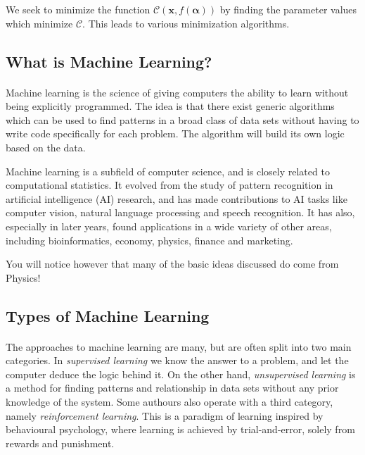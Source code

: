 \documentclass[%
oneside,                 %
final,                   %
10pt]{article}
\begin{document}
\noindent
We seek to minimize the function $\mathcal{C} (\mathbf{x}, f(\mathbf{\alpha}))$ by finding the parameter values which minimize $\mathcal{C}$. This leads to  various minimization algorithms.



\subsection{What is Machine Learning?}

\paragraph{}
Machine learning is the science of giving computers the ability to
learn without being explicitly programmed.  The idea is that there
exist generic algorithms which can be used to find patterns in a broad
class of data sets without having to write code specifically for each
problem. The algorithm will build its own logic based on the data.

Machine learning is a subfield of computer science, and is closely
related to computational statistics.  It evolved from the study of
pattern recognition in artificial intelligence (AI) research, and has
made contributions to AI tasks like computer vision, natural language
processing and speech recognition. It has also, especially in later
years, found applications in a wide variety of other areas, including
bioinformatics, economy, physics, finance and marketing.

You will notice however that many of the basic ideas discussed do come from Physics!



\subsection{Types of Machine Learning}


\paragraph{}
The approaches to machine learning are many, but are often split into two main categories. 
In \emph{supervised learning} we know the answer to a problem,
and let the computer deduce the logic behind it. On the other hand, \emph{unsupervised learning}
is a method for finding patterns and relationship in data sets without any prior knowledge of the system.
Some authours also operate with a third category, namely \emph{reinforcement learning}. This is a paradigm 
of learning inspired by behavioural psychology, where learning is achieved by trial-and-error, 
solely from rewards and punishment.
\end{document}
